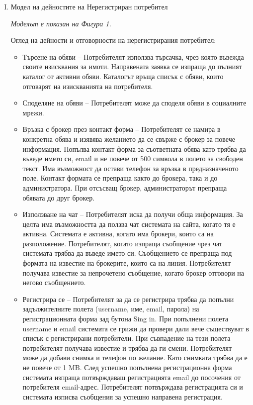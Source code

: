 \documentclass[]{article}
\begin{document}
\begin{enumerate}[I.]
	\item {Модел на дейностите на Нерегистриран потребител
	
\emph{Моделът е показан на Фигура 1.} 

Оглед на дейности и отговорности на нерегистрирания потребител:
	
		\begin{itemize}
		\item {Търсене на обяви – Потребителят използва търсачка, чрез която въвежда своите изисквания за имоти. Направената заявка се изпраща до пълният каталог от активни обяви. Каталогът връща списък с обяви, които отговарят на изискванията на потребителя.
}
		\item {Споделяне на обяви – Потребителят може да споделя обяви в социалните мрежи.
}

		\item {Връзка с брокер през контакт форма – Потребителят се намира в конкретна обява и изявява желанието да се свърже с брокер за повече информация. Попълва контакт форма за съответната обява като трябва да въведе името си, email и не повече от 500 символа в полето за свободен текст. Има възможност да остави телефон за връзка в предназначеното поле. Контакт формата се препраща както до брокера, така и до администратора. При отсъсващ брокер, администраторът препраща обявата до друг брокер.
}
		\item {Използване на чат – Потребителят иска да получи обща информация. За целта има възможността да ползва чат системата на сайта, когато тя е активна. Системата е активна, когато има брокери, които са на разположение. Потребителят, когато изпраща съобщение чрез чат системата трябва да въведе името си. Съобщението се препраща под формата на известие на брокерите, които са на линия. Потребителят получава известие за непрочетено съобщение, когато брокер отговори на негово съобщението.
}
		\item {Регистрира се – Потребителят за да се регистрира трябва да попълни задължителните полета (username, име, email, парола) на регистрационната форма зад бутона Sing in. При попълнени полета username и email системата се грижи да провери дали вече съществуват в списък с регистрирани потребители. При съвпадение на тези полета потребителят получава известие и трябва да ги смени. Потребителят може да добави снимка и телефон по желание. Като снимката трябва да е не повече от 1 MB. След успешно попълнена регистрационна форма системата изпраща потвърждаваш регистрацията email до посочения от потребителя email-адрес. Потребителят потвърждава регистрацията си и системата изписва съобщения за успешно направена регистрация.
}
		\end{itemize}
		
}
\end{enumerate}
\end{document}
